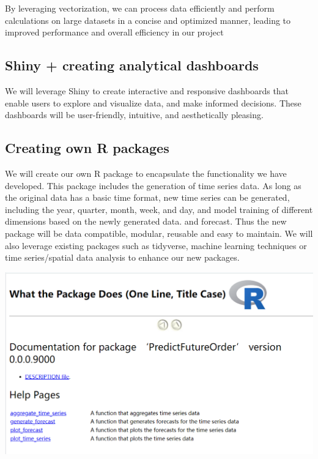 \documentclass[
  11pt,
]{article}
\begin{document}
By leveraging vectorization, we can process data efficiently and perform
calculations on large datasets in a concise and optimized manner,
leading to improved performance and overall efficiency in our project

\hypertarget{shiny-creating-analytical-dashboards}{%
\subsection{Shiny + creating analytical
dashboards}\label{shiny-creating-analytical-dashboards}}

We will leverage Shiny to create interactive and responsive dashboards
that enable users to explore and visualize data, and make informed
decisions. These dashboards will be user-friendly, intuitive, and
aesthetically pleasing.

\hypertarget{creating-own-r-packages}{%
\subsection{Creating own R packages}\label{creating-own-r-packages}}

We will create our own R package to encapsulate the functionality we
have developed. This package includes the generation of time series
data. As long as the original data has a basic time format, new time
series can be generated, including the year, quarter, month, week, and
day, and model training of different dimensions based on the newly
generated data. and forecast. Thus the new package will be data
compatible, modular, reusable and easy to maintain. We will also
leverage existing packages such as tidyverse, machine learning
techniques or time series/spatial data analysis to enhance our new
packages.

\includegraphics{img/R_pkg.png}
\end{document}
